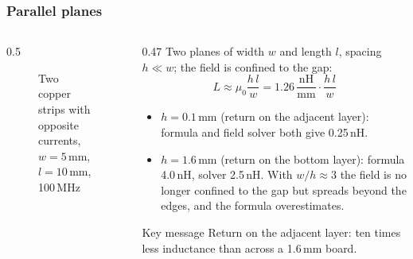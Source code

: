 \begin{frame}
	\frametitle{Parallel planes}
	\begin{columns}[T]
		\begin{column}{0.5\textwidth}
			\begin{figure}
				\centering
				\caption{Two copper strips with opposite currents, $w=5$\,mm, $l=10$\,mm, 100\,MHz}
			\end{figure}
		\end{column}
		\begin{column}{0.47\textwidth}
			\footnotesize
			Two planes of width $w$ and length $l$, spacing $h\ll w$; the field is confined to the gap:
			\begin{equation*}
				L\approx\mu_0\frac{h\,l}{w}=1.26\,\frac{\mathrm{nH}}{\mathrm{mm}}\cdot\frac{h\,l}{w}
			\end{equation*}
			\begin{itemize}
				\item $h=0.1$\,mm (return on the adjacent layer): formula and field solver both give 0.25\,nH.
				\item $h=1.6$\,mm (return on the bottom layer): formula 4.0\,nH, solver 2.5\,nH. With $w/h\approx3$ the field is no longer confined to the gap but spreads beyond the edges, and the formula overestimates.
			\end{itemize}
			\begin{block}{Key message}
				Return on the adjacent layer: ten times less inductance than across a 1.6\,mm board.
			\end{block}
		\end{column}
	\end{columns}
\end{frame}

